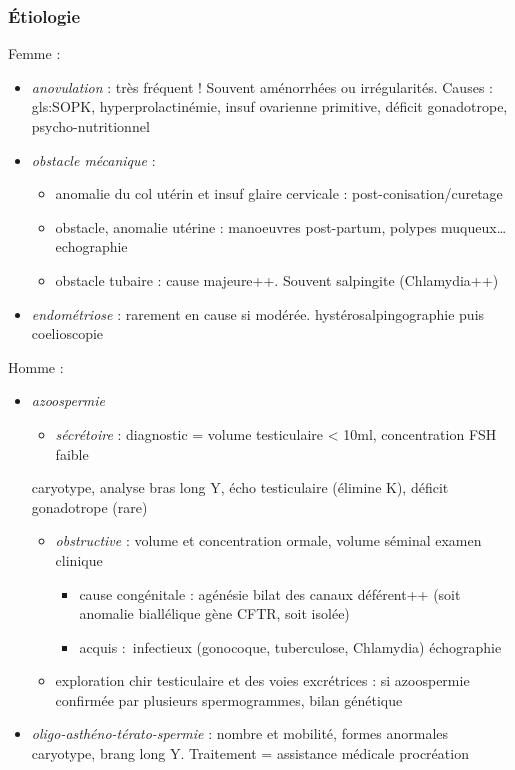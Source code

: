 \documentclass[11pt]{article}
\begin{document}
\subsubsection{Étiologie}
\label{sec:org677bd00}
Femme :
\begin{itemize}
\item \emph{anovulation} : très fréquent ! Souvent aménorrhées ou irrégularités. Causes :
gls:SOPK, hyperprolactinémie, insuf ovarienne primitive, déficit gonadotrope, psycho-nutritionnel
\item \emph{obstacle mécanique} :
\begin{itemize}
\item anomalie du col utérin et insuf glaire cervicale : post-conisation/curetage
\item obstacle, anomalie utérine : manoeuvres post-partum, polypes muqueux\ldots{} \thus
echographie
\item obstacle tubaire : cause majeure++. Souvent salpingite (Chlamydia++)
\end{itemize}
\item \emph{endométriose} : rarement en cause si modérée. hystérosalpingographie puis coelioscopie
\end{itemize}
Homme :
\begin{itemize}
\item \emph{azoospermie}
\begin{itemize}
\item \emph{sécrétoire} : diagnostic = volume testiculaire < 10ml, concentration FSH
faible
\end{itemize}
\thus caryotype, analyse bras long Y, écho testiculaire (élimine K), déficit gonadotrope (rare)
\begin{itemize}
\item \emph{obstructive} : volume et concentration ormale, volume séminal \dec \thus
examen clinique
\begin{itemize}
\item cause congénitale : agénésie bilat des canaux déférent++ (soit anomalie
biallélique gène CFTR, soit isolée)
\item acquis : infectieux  (gonocoque, tuberculose, Chlamydia) \thus échographie
\end{itemize}
\item exploration chir testiculaire et des voies excrétrices : si azoospermie
confirmée par plusieurs spermogrammes, bilan génétique
\end{itemize}
\item \emph{oligo-asthéno-térato-spermie} : \dec nombre et mobilité, \inc formes anormales
\thus caryotype, brang long Y. Traitement = assistance médicale procréation
\end{itemize}
\end{document}
